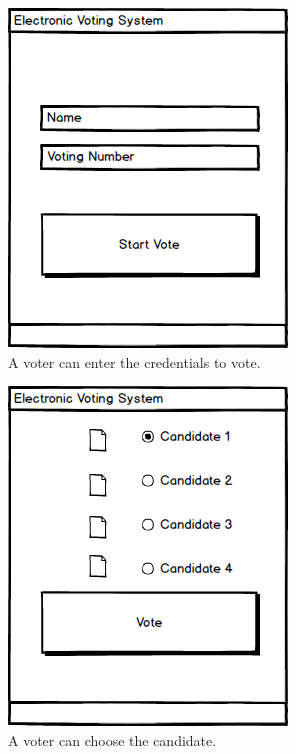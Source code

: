 \documentclass{article}
\begin{document}
\begin{figure}[H]
\centering
	\includegraphics[scale=0.5]{1.png}
	\caption{A voter can enter the credentials to vote.}
	\label{fig:PropProf}
\end{figure}

\begin{figure}[H]
\centering
	\includegraphics[scale=0.5]{2.png}
	\caption{A voter can choose the candidate.}
	\label{fig:PropProf}
\end{figure}
\end{document}
